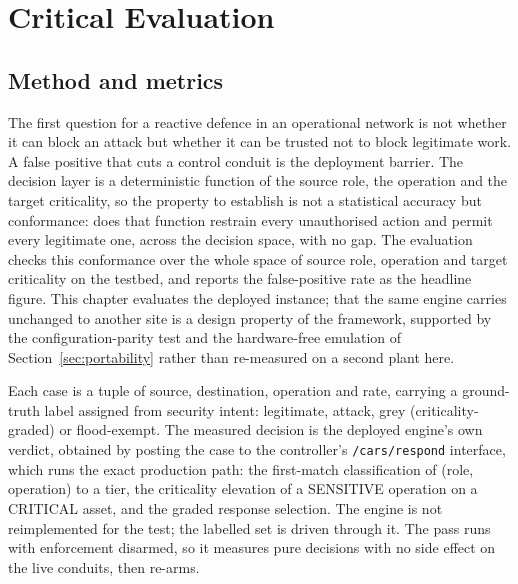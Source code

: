 \chapter{Critical Evaluation}
\label{chap:evaluation}

\section{Method and metrics}
\label{sec:evalmethod}

The first question for a reactive defence in an operational network is not whether it can block an attack but whether it can be trusted not to block legitimate work. A false positive that cuts a control conduit is the deployment barrier. The decision layer is a deterministic function of the source role, the operation and the target criticality, so the property to establish is not a statistical accuracy but conformance: does that function restrain every unauthorised action and permit every legitimate one, across the decision space, with no gap. The evaluation checks this conformance over the whole space of source role, operation and target criticality on the testbed, and reports the false-positive rate as the headline figure. This chapter evaluates the deployed instance; that the same engine carries unchanged to another site is a design property of the framework, supported by the configuration-parity test and the hardware-free emulation of Section~\ref{sec:portability} rather than re-measured on a second plant here.

Each case is a tuple of source, destination, operation and rate, carrying a ground-truth label assigned from security intent: legitimate, attack, grey (criticality-graded) or flood-exempt. The measured decision is the deployed engine's own verdict, obtained by posting the case to the controller's \texttt{/cars/respond} interface, which runs the exact production path: the first-match classification of (role, operation) to a tier, the criticality elevation of a SENSITIVE operation on a CRITICAL asset, and the graded response selection. The engine is not reimplemented for the test; the labelled set is driven through it. The pass runs with enforcement disarmed, so it measures pure decisions with no side effect on the live conduits, then re-arms.

